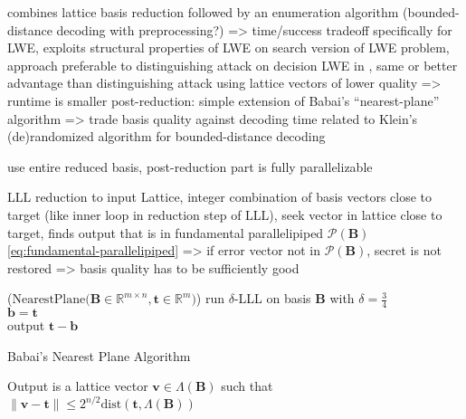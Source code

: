 combines lattice basis reduction followed by an enumeration algorithm (bounded-distance decoding with preprocessing?) => time/success tradeoff
specifically for LWE, exploits structural properties of LWE
on search version of LWE problem, approach preferable to distinguishing attack on decision LWE in \cite{MR09, RS10}, same or better advantage than distinguishing attack using lattice vectors of lower quality => runtime is smaller
post-reduction: simple extension of Babai's ``nearest-plane'' algorithm \cite{Bab85} %
=> trade basis quality against decoding time
related to Klein's (de)randomized algorithm \cite{Kle00} for bounded-distance decoding

use entire reduced basis, post-reduction part is fully parallelizable



LLL reduction to input Lattice, integer combination of basis vectors close to target (like inner loop in reduction step of LLL), seek vector in lattice close to target, finds output that is in fundamental parallelipiped $\mathcal{P}(\mathbf{B})$ \cref{eq:fundamental-parallelipiped} => if error vector not in $\mathcal{P}(\mathbf{B})$, secret is not restored %
=> basis quality has to be sufficiently good
\begin{algorithm2e}
\Begin($\text{NearestPlane} {(}\mathbf{B} \in \mathbb{R}^{m \times n},\mathbf{t}\in \mathbb{R}^{m}{)}$)
{
  run $\delta$-LLL on basis $\mathbf{B}$ with $\delta=\frac{3}{4}$\\ %
  $\mathbf{b} = \mathbf{t}$\\
  output $\mathbf{t} - \mathbf{b}$
}
\caption{Babai's Nearest Plane Algorithm \cite{Bab85}}\label{alg:babai} %
\end{algorithm2e}

Output is a lattice vector $\mathbf{v} \in \Lambda(\mathbf{B})$ such that $\|\mathbf{v} - \mathbf{t}\| \leq 2^{n/2} \text{dist}(\mathbf{t}, \Lambda(\mathbf{B}))$ %

